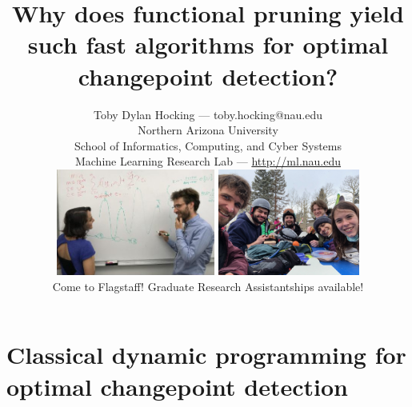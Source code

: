 \documentclass{beamer}
\begin{document}
\title{Why does functional pruning yield such fast algorithms for
  optimal changepoint detection?}

\author{
  Toby Dylan Hocking --- toby.hocking@nau.edu\\ 
  Northern Arizona University\\
  School of Informatics, Computing, and Cyber Systems\\
  Machine Learning Research Lab --- \url{http://ml.nau.edu}\\
  \includegraphics[height=3.5cm]{photo-atiyeh-whiteboard}
  \includegraphics[height=3.5cm]{2021-03-lab-ski-lunch} \\
  Come to Flagstaff! Graduate Research Assistantships available!
}

\date{}

\maketitle

\section{Classical dynamic programming for optimal changepoint detection}
\end{document}
